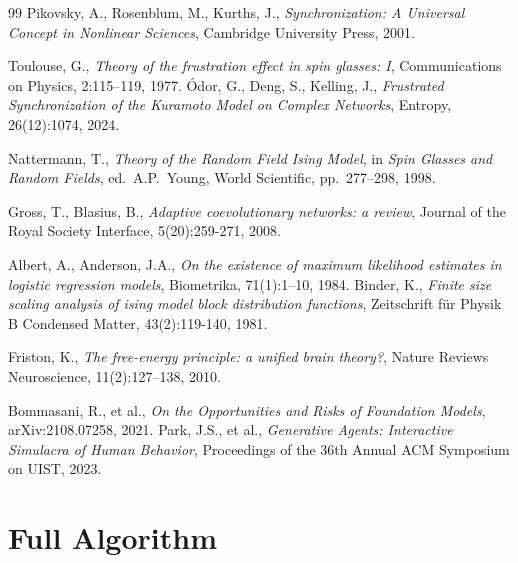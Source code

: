 \documentclass[11pt]{article}
\begin{document}
\begin{thebibliography}{99}
 Pikovsky, A., Rosenblum, M., Kurths, J., \emph{Synchronization: A Universal Concept in Nonlinear Sciences}, Cambridge University Press, 2001.

 Toulouse, G., \emph{Theory of the frustration effect in spin glasses: I}, Communications on Physics, 2:115--119, 1977.
 \'Odor, G., Deng, S., Kelling, J., \emph{Frustrated Synchronization of the Kuramoto Model on Complex Networks}, Entropy, 26(12):1074, 2024.

 Nattermann, T., \emph{Theory of the Random Field Ising Model}, in \emph{Spin Glasses and Random Fields}, ed.\ A.P.\ Young, World Scientific, pp.\ 277--298, 1998.

 Gross, T., Blasius, B., \emph{Adaptive coevolutionary networks: a review}, Journal of the Royal Society Interface, 5(20):259-271, 2008.

 Albert, A., Anderson, J.A., \emph{On the existence of maximum likelihood estimates in logistic regression models}, Biometrika, 71(1):1--10, 1984.
 Binder, K., \emph{Finite size scaling analysis of ising model block distribution functions}, Zeitschrift f\"ur Physik B Condensed Matter, 43(2):119-140, 1981.

 Friston, K., \emph{The free-energy principle: a unified brain theory?}, Nature Reviews Neuroscience, 11(2):127--138, 2010.

 Bommasani, R., et al., \emph{On the Opportunities and Risks of Foundation Models}, arXiv:2108.07258, 2021.
 Park, J.S., et al., \emph{Generative Agents: Interactive Simulacra of Human Behavior}, Proceedings of the 36th Annual ACM Symposium on UIST, 2023.

\end{thebibliography}

\appendix

\section{Full Algorithm}
\label{app:algorithm}
\end{document}
